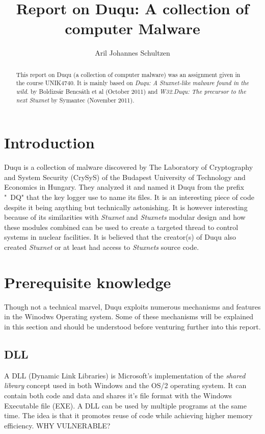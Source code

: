 \documentclass[12pt,english,a4paper]{article}
\title{Report on Duqu: A collection of computer Malware}
\author{Aril Johannes Schultzen}
\begin{document}
\maketitle
\thispagestyle{empty}
\setcounter{page}{0}
\tableofcontents
\thispagestyle{empty}
\setcounter{page}{0}
\thispagestyle{empty}
\setcounter{page}{0}
\clearpage
\setcounter{page}{1}

\begin{abstract}
This report on Duqu (a collection of computer malware) was an assignment given in the course UNIK4740. It is mainly based on \textit{Duqu: A Stuxnet-like malware found in the wild.}\cite{DUQU_BUD} by Boldizsár Bencsáth et al (October 2011) and \textit{W32.Duqu: The precursor to the next Stuxnet}\cite{DUQU_SYMANTEC} by Symantec (November 2011).
\end{abstract}
\newpage

\section{Introduction}
Duqu is a collection of malware discovered by The Laboratory of Cryptography and System Security (CrySyS) of the Budapest University of Technology and Economics in Hungary. They analyzed it and named it Duqu from the prefix "~DQ" that the key logger use to name its files. It is an interesting piece of code despite it being anything but technically astonishing. It is however interesting because of its similarities with \textit{Stuxnet} and \textit{Stuxnets} modular design and how these modules combined can be used to create a targeted thread to control systems in nuclear facilities. It is believed that the creator(s) of Duqu also created \textit{Stuxnet} or at least had access to \textit{Stuxnets} source code.

\section{Prerequisite knowledge}
Though not a technical marvel, Duqu exploits numerous mechanisms and features in the Winodws Operating system. Some of these mechanisms will be explained in this section and should be understood before venturing further into this report.

\subsection{DLL}
A DLL (Dynamic Link Libraries) is Microsoft's implementation of the \textit{shared library} concept used in both Windows and the OS/2 operating system. It can contain both code and data and shares it's file format with the Windows Executable file (EXE). A DLL can be used by multiple programs at the same time. The idea is that it promotes reuse of code while achieving higher memory efficiency. WHY VULNERABLE?
\end{document}
